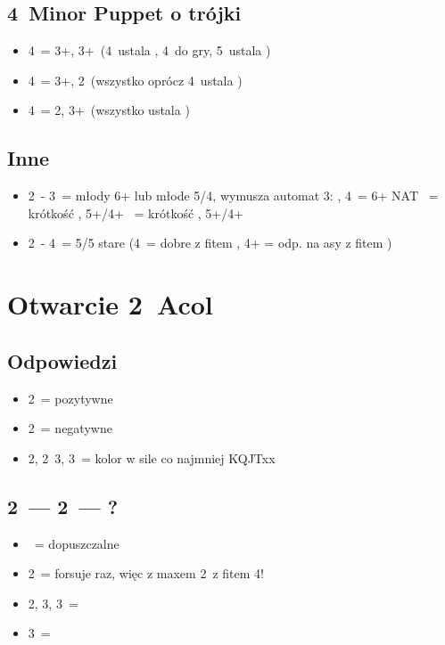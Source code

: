 \documentclass[12pt, a4paper]{article}
\begin{document}
\subsection*{4\diams\ Minor Puppet o trójki}
\begin{itemize}
    \item 4\hearts\ = 3+\clubs, 3+\diams\ (4\spades\ ustala \clubs, 4\nt\ do gry, 5\clubs\ ustala \diams)
    \item 4\spades\ = 3+\clubs, 2\diams\ (wszystko oprócz 4\nt\ ustala \clubs)
    \item 4\nt\ = 2\clubs, 3+\diams\ (wszystko ustala \diams)
\end{itemize}


\subsection*{Inne}
\begin{itemize}
    \item 2\nt\ - 3\spades\ = młody 6+ lub młode 5/4, wymusza automat 3\nt:
    \clubs, 4\diams\ = 6+ NAT
    \hearts\ = krótkość \hearts, 5+/4+
    \spades\ = krótkość \spades, 5+/4+
    \item 2\nt\ - 4\clubs\ = 5/5 stare (4\diams\ = dobre z fitem \hearts, 4\nt+ = odp. na asy z fitem \spades)
\end{itemize}



\pagebreak
\section{Otwarcie 2\clubs\ Acol}
\subsection*{Odpowiedzi}
\begin{itemize}
    \item 2\diams\ = pozytywne
    \item 2\hearts\ = negatywne
    \item 2\spades, 2\nt\, 3\clubs, 3\diams\ = kolor w sile co najmniej \hearts KQJTxx 
\end{itemize}

\subsection*{2\clubs\ --- 2\hearts\ --- ?}
\begin{itemize}
    \item \pass\ = dopuszczalne
    \item 2\spades\ = forsuje raz, więc z maxem 2\hearts\ z fitem 4\spades!
    \item 2\nt, 3\clubs, 3\diams\ = \nf
    \item 3\hearts\ = \gf
\end{itemize}
\end{document}
